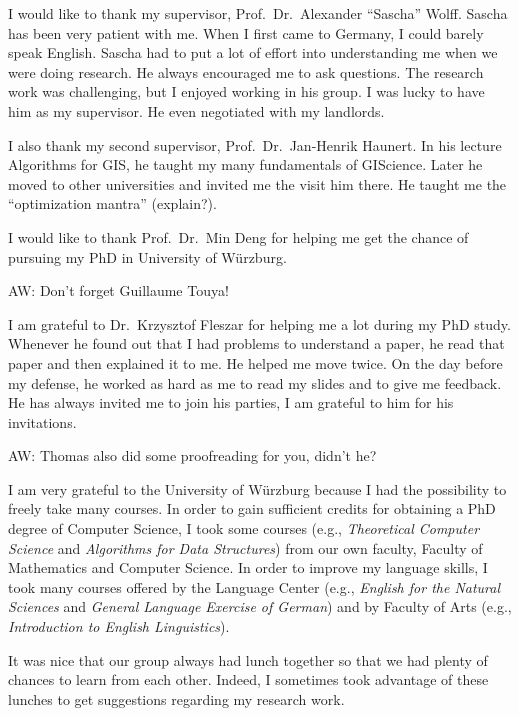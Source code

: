 
I would like to thank my supervisor, 
Prof.\ Dr.\ Alexander ``Sascha'' Wolff.
Sascha has been very patient with me.
When I first came to Germany, I could barely speak English.
Sascha had to put a lot of effort into understanding me
when we were doing research.
He always encouraged me to ask questions.
The research work was challenging,
but I enjoyed working in his group.
I was lucky to have him as my supervisor.
He even negotiated with my landlords.

I also thank my second supervisor, Prof.\ Dr.\ Jan-Henrik Haunert.  In
his lecture Algorithms for GIS, he taught my many fundamentals of
GIScience.  Later he moved to other universities and invited me the
visit him there.  He taught me the ``optimization mantra'' (explain?).

I would like to thank Prof.\ Dr.\ Min Deng
for helping me get the chance of
pursuing my PhD in University of W\"urzburg.

AW: Don't forget Guillaume Touya!

I am grateful to Dr.\ Krzysztof Fleszar for 
helping me a lot during my PhD study.
Whenever he found out that I had problems to understand a paper,
he read that paper and then explained it to me.
He helped me move twice.
On the day before my defense, he worked as hard as me
to read my slides and to give me feedback.
He has always invited me to join his parties, 
I am grateful to him for his invitations. 

AW: Thomas also did some proofreading for you, didn't he?

I am very grateful to the University of W\"urzburg 
because I had the possibility to freely take many courses.
In order to gain sufficient credits for 
obtaining a PhD degree of Computer Science,
I took some courses
(e.g., \emph{Theoretical Computer Science}
and \emph{Algorithms for Data Structures})
from our own faculty, 
Faculty of Mathematics and Computer Science.
%
In order to improve my language skills,
I took many courses
offered by the Language Center
(e.g., \emph{English for the Natural Sciences} 
and \emph{General Language Exercise of German})
and by Faculty of Arts 
(e.g., \emph{Introduction to English Linguistics}).

It was nice that our group always had lunch together
so that we had plenty of chances to learn from each other.
Indeed, I sometimes took advantage of these lunches
to get suggestions regarding my research work.

